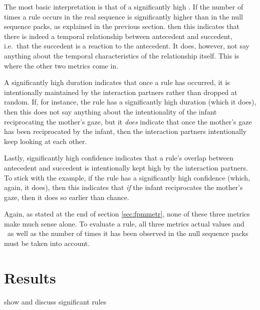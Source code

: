 The most basic interpretation is that of a significantly high \noc.
If the number of times a rule occurs in the real sequence is significantly higher than in the null sequence packs, as explained in the previous section. then this indicates that there is indeed a temporal relationship between antecedent and succedent, i.e.~that the succedent is a reaction to the antecedent.
It does, however, not say anything about the temporal characteristics of the relationship itself.
This is where the other two metrics come in.

A significantly high duration indicates that once a rule has occurred, it is intentionally maintained by the interaction partners rather than dropped at random.
If, for instance, the rule \fpmtextrule{\mogain}{\ingamo} has a significantly high duration (which it does), then this does not say anything about the intentionality of the infant reciprocating the mother's gaze, but it \emph{does} indicate that once the mother's gaze has been reciprocated by the infant, then the interaction partners intentionally keep looking at each other.

Lastly, significantly high confidence indicates that a rule's overlap between antecedent and succedent is intentionally kept high by the interaction partners.
To stick with the example, if the rule \fpmtextrule{\mogain}{\ingamo} has a significantly high confidence (which, again, it does), then this indicates that \emph{if} the infant reciprocates the mother's gaze, then it does so earlier than chance.

Again, as stated at the end of section \ref{sec:fpmmetr}, none of these three metrics make much sense alone.
To evaluate a rule, all three metrics actual values and \pv\ as well as the number of times it has been observed in the null sequence packs must be taken into account.

\section{Results}
\label{sec:sigres}
show and discuss significant rules



















































